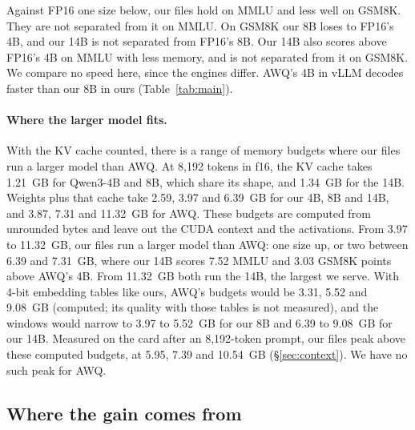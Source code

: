Against FP16 one size below, our files hold on MMLU and less well on GSM8K.
They are not separated from it on MMLU. On GSM8K our 8B loses to FP16's 4B,
and our 14B is not separated from FP16's 8B. Our 14B also scores above FP16's
4B on MMLU with less memory, and is not separated from it on GSM8K. We compare
no speed here, since the engines differ. AWQ's 4B in vLLM decodes faster than
our 8B in ours (Table~\ref{tab:main}).

\paragraph{Where the larger model fits.} With the KV cache counted, there is
a range of memory budgets where our files run a larger model than AWQ. At
8{,}192 tokens in f16, the KV
cache takes 1.21~GB for Qwen3-4B and 8B, which share its shape, and 1.34~GB
for the 14B. Weights plus that cache take 2.59, 3.97 and 6.39~GB for our 4B,
8B and 14B, and 3.87, 7.31 and 11.32~GB for AWQ. These budgets are computed
from unrounded bytes and leave out the CUDA context and the activations. From
3.97 to 11.32~GB, our files run a larger model than AWQ: one size up, or two
between 6.39 and 7.31~GB, where our 14B scores 7.52 MMLU and 3.03 GSM8K points
above AWQ's 4B. From 11.32~GB both run the 14B, the largest we serve. With
4-bit embedding tables like ours, AWQ's budgets would be 3.31, 5.52 and
9.08~GB (computed; its quality with those tables is not measured), and the
windows would narrow to 3.97 to 5.52~GB for our 8B and 6.39 to 9.08~GB for our
14B. Measured on the card after an 8{,}192-token prompt, our files peak
above these computed budgets, at 5.95, 7.39 and 10.54~GB
(\S\ref{sec:context}). We have no such peak for AWQ.

\subsection{Where the gain comes from}
\label{sec:chain}

